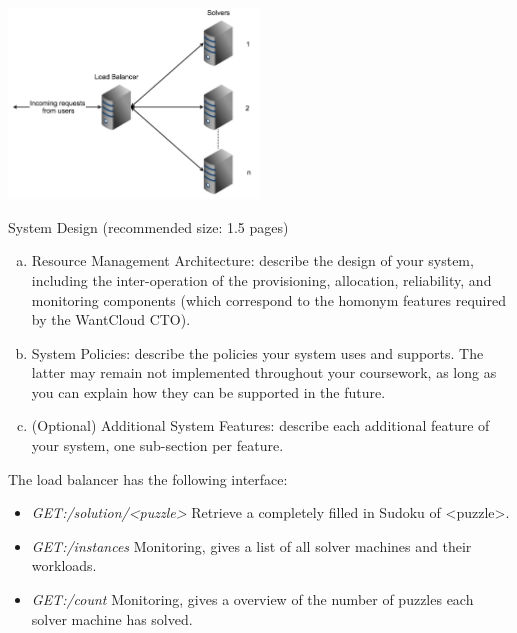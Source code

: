 \includegraphics[width=0.5\textwidth]{img/arch}

System Design (recommended size: 1.5 pages)
\begin{enumerate}[(a)]
	\item Resource Management Architecture: describe the design of your system,
		including the inter-operation of the provisioning, allocation, reliability, and monitoring components (which correspond to the homonym features required by the WantCloud CTO).
	\item System Policies: describe the policies your system uses and supports.
		The latter may remain not implemented throughout your coursework, as long as you can explain how they can be supported in the future.
	\item (Optional) Additional System Features: describe each additional feature of your system, one sub-section per feature.
\end{enumerate}

The load balancer has the following interface:
\begin{itemize}
	\item \emph{GET:/solution/<puzzle>} Retrieve a completely filled in Sudoku of <puzzle>.
	\item \emph{GET:/instances} Monitoring, gives a list of all solver machines and their workloads.
	\item \emph{GET:/count} Monitoring, gives a overview of the number of puzzles each solver machine has solved.
\end{itemize}
